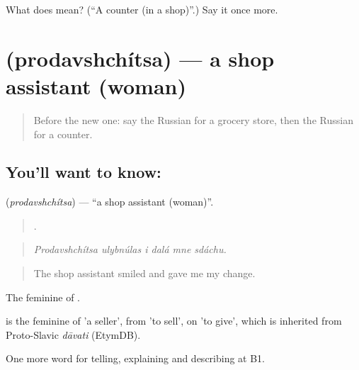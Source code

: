 \begin{tcolorbox}[breakable,colback=teal!4,colframe=teal!35!black,title={Before you move on}]
What does  mean? (\textquotedblleft{}A counter (in a shop)\textquotedblright{}.) Say it once more.
\end{tcolorbox}
\section[\texorpdfstring{\ru{продавщица} (prodavshchítsa)}{продавщица (prodavshchítsa)}]{ (prodavshchítsa) — a shop assistant (woman)}

\label{lesson:RU-C452-prodavshchitsa}



\begin{quote}
Before the new one: say the Russian for a grocery store, then the Russian for a counter.
\end{quote}

\subsection*{You'll want to know: }
\textbf{} (\emph{prodavshchítsa}) — \textquotedblleft{}a shop assistant (woman)\textquotedblright{}.

\begin{quote}
     .
\end{quote}

\begin{quote}
\emph{Prodavshchítsa ulybnúlas i dalá mne sdáchu.}
\end{quote}

\begin{quote}
The shop assistant smiled and gave me my change.
\end{quote}

The feminine of \emph{}.

\begin{cousinweb}
\emph{} is the feminine of \emph{} 'a seller', from \emph{} 'to sell', on \emph{} 'to give', which is inherited from Proto-Slavic \emph{dāvati} (EtymDB).
\end{cousinweb}

\begin{grammarlens}[title={What you've built}]
One more word for telling, explaining and describing at B1.
\end{grammarlens}

